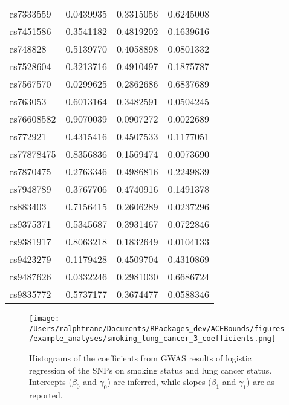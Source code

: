 \documentclass[
]{article}
\theoremstyle{plain}
\begin{document}
\begin{table}[H]
\begin{minipage}{0.5\linewidth}
\begin{table}[H]
\begin{tabular}{lrrr}
\addlinespace
rs7333559 & 0.0439935 & 0.3315056 & 0.6245008\\
rs7451586 & 0.3541182 & 0.4819202 & 0.1639616\\
rs748828 & 0.5139770 & 0.4058898 & 0.0801332\\
rs7528604 & 0.3213716 & 0.4910497 & 0.1875787\\
rs7567570 & 0.0299625 & 0.2862686 & 0.6837689\\
\addlinespace
rs763053 & 0.6013164 & 0.3482591 & 0.0504245\\
rs76608582 & 0.9070039 & 0.0907272 & 0.0022689\\
rs772921 & 0.4315416 & 0.4507533 & 0.1177051\\
rs77878475 & 0.8356836 & 0.1569474 & 0.0073690\\
rs7870475 & 0.2763346 & 0.4986816 & 0.2249839\\
\addlinespace
rs7948789 & 0.3767706 & 0.4740916 & 0.1491378\\
rs883403 & 0.7156415 & 0.2606289 & 0.0237296\\
rs9375371 & 0.5345687 & 0.3931467 & 0.0722846\\
rs9381917 & 0.8063218 & 0.1832649 & 0.0104133\\
rs9423279 & 0.1179428 & 0.4509704 & 0.4310869\\
\addlinespace
rs9487626 & 0.0332246 & 0.2981030 & 0.6686724\\
rs9835772 & 0.5737177 & 0.3674477 & 0.0588346\\
\bottomrule
\end{tabular}
\end{table}


  \end{minipage}
\end{table}

\begin{figure}[H]
  \center
  \texttt{[image: /Users/ralphtrane/Documents/RPackages\_dev/ACEBounds/figures/example\_analyses/smoking\_lung\_cancer\_3\_coefficients.png]}
  \caption{Histograms of the coefficients from GWAS results of logistic regression of the SNPs on smoking status and lung cancer status. Intercepts ($\beta_0$ and $\gamma_0$) are inferred, while slopes ($\beta_1$ and $\gamma_1$) are as reported.}
  \label{fig:marginal-distribution-of-coefficients-lung-cancer}
\end{figure}
\end{document}
